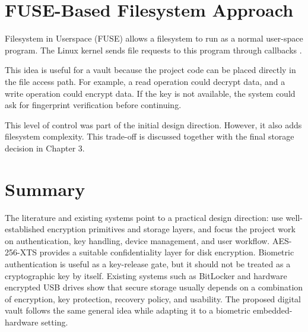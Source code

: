 \section{FUSE-Based Filesystem Approach}

Filesystem in Userspace (FUSE) allows a filesystem to run as a normal user-space program. The Linux kernel sends file requests to this program through callbacks \cite{libfuse,linuxFuseDocs}.

This idea is useful for a vault because the project code can be placed directly in the file access path. For example, a read operation could decrypt data, and a write operation could encrypt data. If the key is not available, the system could ask for fingerprint verification before continuing.

This level of control was part of the initial design direction. However, it also adds filesystem complexity. This trade-off is discussed together with the final storage decision in Chapter 3.

\section{Summary}

The literature and existing systems point to a practical design direction: use well-established encryption primitives and storage layers, and focus the project work on authentication, key handling, device management, and user workflow. AES-256-XTS provides a suitable confidentiality layer for disk encryption. Biometric authentication is useful as a key-release gate, but it should not be treated as a cryptographic key by itself. Existing systems such as BitLocker and hardware encrypted USB drives show that secure storage usually depends on a combination of encryption, key protection, recovery policy, and usability. The proposed digital vault follows the same general idea while adapting it to a biometric embedded-hardware setting.
